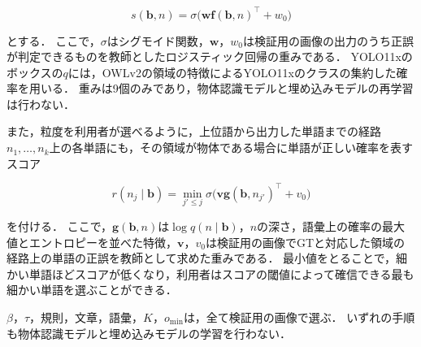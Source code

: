 \begin{equation}
    s({\mathbf b}, n) = \sigma \bigl( {\mathbf w} {\mathbf f}({\mathbf b}, n)^{\top} + w_0 \bigr)
    \label{eq_score}
\end{equation}

\noindent
とする．
ここで，$ \sigma $はシグモイド関数，$ {\mathbf w} $，$ w_0 $は検証用の画像の出力のうち正誤が判定できるものを教師としたロジスティック回帰の重みである．
YOLO11xのボックスの$ q $には，OWLv2の領域の特徴によるYOLO11xのクラスの集約した確率を用いる．
重みは9個のみであり，物体認識モデルと埋め込みモデルの再学習は行わない．

また，粒度を利用者が選べるように，上位語から出力した単語までの経路$ n_1, \ldots, n_k $上の各単語にも，その領域が物体である場合に単語が正しい確率を表すスコア

\begin{equation}
    r(n_j \mid {\mathbf b}) = \min_{j' \leq j} \sigma \bigl( {\mathbf v} {\mathbf g}({\mathbf b}, n_{j'})^{\top} + v_0 \bigr)
    \label{eq_word_score}
\end{equation}

\noindent
を付ける．
ここで，$ {\mathbf g}({\mathbf b}, n) $は$ \log q(n \mid {\mathbf b}) $，$ n $の深さ，語彙上の確率の最大値とエントロピーを並べた特徴，$ {\mathbf v} $，$ v_0 $は検証用の画像でGTと対応した領域の経路上の単語の正誤を教師として求めた重みである．
最小値をとることで，細かい単語ほどスコアが低くなり，利用者はスコアの閾値によって確信できる最も細かい単語を選ぶことができる．

$ \beta $，$ \tau $，規則，文章，語彙，$ K $，$ o_{\min} $は，全て検証用の画像で選ぶ．
いずれの手順も物体認識モデルと埋め込みモデルの学習を行わない．
